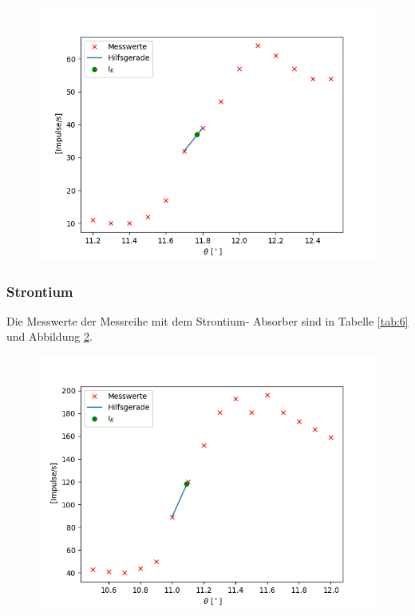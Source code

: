 \begin{figure}
    \centering
    \includegraphics{rb.png}
    \label{fig:rb}
\end{figure}

\subsubsection{Strontium}

Die Messwerte der Messreihe mit dem Strontium- Absorber sind in Tabelle \ref{tab:6} und Abbildung \ref{fig:sr}. 

\begin{figure}
    \centering
    \includegraphics{sr.png}
    \label{fig:sr}
\end{figure}

